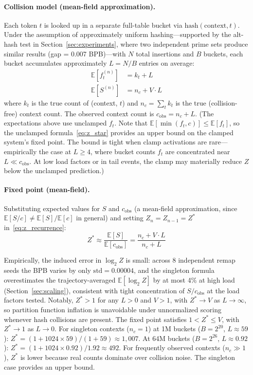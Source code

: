 \documentclass[11pt]{article}
\newcommand{\E}{\mathbb{E}}
\begin{document}
\smallskip

\paragraph{Collision model (mean-field approximation).} Each token $t$ is looked up in a separate full-table bucket via $\text{hash}(\text{context}, t)$. Under the assumption of approximately uniform hashing---supported by the alt-hash test in Section~\ref{sec:experiments}, where two independent prime sets produce similar results (gap = 0.007 BPB)---with $N$ total insertions and $B$ buckets, each bucket accumulates approximately $L = N/B$ entries on average:
\begin{align}
\E[f_t^{(n)}] &= k_t + L \\
\E[S^{(n)}] &= n_c + V \cdot L
\end{align}
where $k_t$ is the true count of (context, $t$) and $n_c = \sum_t k_t$ is the true (collision-free) context count. The observed context count is $c_{\text{obs}} = n_c + L$. (The expectations above use unclamped $f_t$. Note that $\E[\min(f_t, c)] \leq \E[f_t]$, so the unclamped formula~\eqref{eq:z_star} provides an upper bound on the clamped system's fixed point. The bound is tight when clamp activations are rare---empirically the case at $L \geq 4$, where bucket counts $f_t$ are concentrated near $L \ll c_{\text{obs}}$. At low load factors or in tail events, the clamp may materially reduce $Z$ below the unclamped prediction.)

\paragraph{Fixed point (mean-field).} Substituting expected values for $S$ and $c_{\text{obs}}$ (a mean-field approximation, since $\E[S/c] \neq \E[S]/\E[c]$ in general) and setting $Z_n = Z_{n-1} = Z^*$ in~\eqref{eq:z_recurrence}:
\begin{equation}
Z^* \approx \frac{\E[S]}{\E[c_{\text{obs}}]} = \frac{n_c + V \cdot L}{n_c + L}
\label{eq:z_star}
\end{equation}

Empirically, the induced error in $\log_2 Z$ is small: across 8 independent remap seeds the BPB varies by only $\text{std} = 0.00004$, and the singleton formula overestimates the trajectory-averaged $\E[\log_2 Z]$ by at most 4\% at high load (Section~\ref{sec:scaling}), consistent with tight concentration of $S/c_{\text{obs}}$ at the load factors tested. Notably, $Z^* > 1$ for any $L > 0$ and $V > 1$, with $Z^* \to V$ as $L \to \infty$, so partition function inflation is unavoidable under unnormalized scoring whenever hash collisions are present. The fixed point satisfies $1 < Z^* \leq V$, with $Z^* \to 1$ as $L \to 0$. For singleton contexts ($n_c = 1$) at 1M buckets ($B = 2^{20}$, $L \approx 59$): $Z^* = (1 + 1024 \times 59)/(1 + 59) \approx 1{,}007$. At 64M buckets ($B = 2^{26}$, $L \approx 0.92$): $Z^* = (1 + 1024 \times 0.92)/1.92 \approx 492$. For frequently observed contexts ($n_c \gg 1$), $Z^*$ is lower because real counts dominate over collision noise. The singleton case provides an upper bound.
\end{document}
